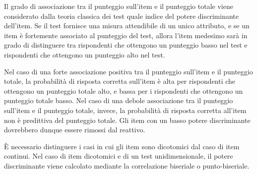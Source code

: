 Il grado di associazione tra il punteggio sull'item e il
    punteggio totale  
    viene considerato dalla teoria classica dei test quale indice del
    potere discriminante dell'item.  
  Se il test fornisce una
    misura attendibile di un unico attributo, e se un item è
    fortemente associato al punteggio del test, allora l'item medesimo
    sarà in grado di distinguere tra rispondenti che ottengono un
    punteggio basso nel test e rispondenti che ottengono un punteggio
    alto nel test.  

Nel caso di una forte associazione positiva tra il punteggio sull'item e il punteggio totale, la
probabilità di risposta corretta sull'item è alta per rispondenti che ottengono
un punteggio totale alto, e bassa per i rispondenti che
ottengono un punteggio totale basso. Nel caso di una debole
associazione tra il punteggio sull'item e il punteggio totale, invece,
la probabilità di risposta corretta all'item non è predittiva del
punteggio totale. Gli item con un basso potere discriminante dovrebbero dunque essere rimossi dal reattivo. 

È necessario distinguere i casi in cui gli item sono dicotomici dal caso di item continui.  Nel caso di item dicotomici
 e di un test unidimensionale, il potere discriminante viene  calcolato mediante la correlazione biseriale o punto-biseriale. 


